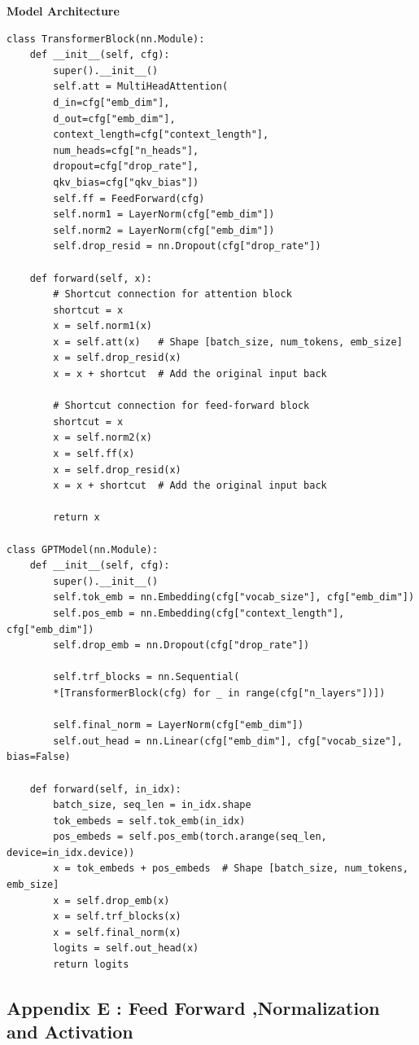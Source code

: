 \lstset{
	language=Python,
    basicstyle=\rmfamily\small, %
	breaklines=true,
	showstringspaces=false,
	frame=single,
	tabsize=2
}

\textbf{Model Architecture}

\begin{lstlisting}
class TransformerBlock(nn.Module):
	def __init__(self, cfg):
		super().__init__()
		self.att = MultiHeadAttention(
		d_in=cfg["emb_dim"],
		d_out=cfg["emb_dim"],
		context_length=cfg["context_length"],
		num_heads=cfg["n_heads"],
		dropout=cfg["drop_rate"],
		qkv_bias=cfg["qkv_bias"])
		self.ff = FeedForward(cfg)
		self.norm1 = LayerNorm(cfg["emb_dim"])
		self.norm2 = LayerNorm(cfg["emb_dim"])
		self.drop_resid = nn.Dropout(cfg["drop_rate"])

	def forward(self, x):
		# Shortcut connection for attention block
		shortcut = x
		x = self.norm1(x)
		x = self.att(x)   # Shape [batch_size, num_tokens, emb_size]
		x = self.drop_resid(x)
		x = x + shortcut  # Add the original input back
		
		# Shortcut connection for feed-forward block
		shortcut = x
		x = self.norm2(x)
		x = self.ff(x)
		x = self.drop_resid(x)
		x = x + shortcut  # Add the original input back
		
		return x

class GPTModel(nn.Module):
	def __init__(self, cfg):
		super().__init__()
		self.tok_emb = nn.Embedding(cfg["vocab_size"], cfg["emb_dim"])
		self.pos_emb = nn.Embedding(cfg["context_length"], cfg["emb_dim"])
		self.drop_emb = nn.Dropout(cfg["drop_rate"])
		
		self.trf_blocks = nn.Sequential(
		*[TransformerBlock(cfg) for _ in range(cfg["n_layers"])])
		
		self.final_norm = LayerNorm(cfg["emb_dim"])
		self.out_head = nn.Linear(cfg["emb_dim"], cfg["vocab_size"], bias=False)

	def forward(self, in_idx):
		batch_size, seq_len = in_idx.shape
		tok_embeds = self.tok_emb(in_idx)
		pos_embeds = self.pos_emb(torch.arange(seq_len, device=in_idx.device))
		x = tok_embeds + pos_embeds  # Shape [batch_size, num_tokens, emb_size]
		x = self.drop_emb(x)
		x = self.trf_blocks(x)
		x = self.final_norm(x)
		logits = self.out_head(x)
		return logits
\end{lstlisting}
\pagebreak

\subsection*{Appendix E : Feed Forward ,Normalization and Activation}


